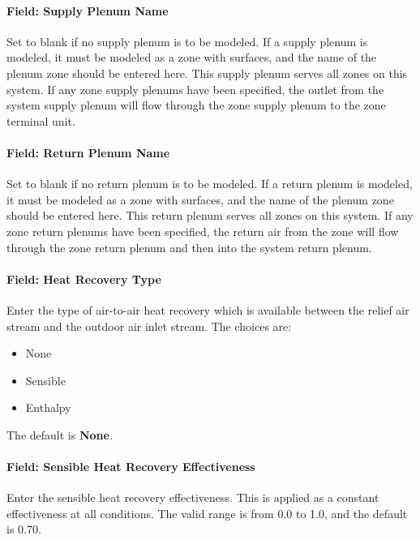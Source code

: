 \paragraph{Field: Supply Plenum Name}\label{field-supply-plenum-name-7}

Set to blank if no supply plenum is to be modeled. If a supply plenum is modeled, it must be modeled as a zone with surfaces, and the name of the plenum zone should be entered here. This supply plenum serves all zones on this system. If any zone supply plenums have been specified, the outlet from the system supply plenum will flow through the zone supply plenum to the zone terminal unit.

\paragraph{Field: Return Plenum Name}\label{field-return-plenum-name-8}

Set to blank if no return plenum is to be modeled. If a return plenum is modeled, it must be modeled as a zone with surfaces, and the name of the plenum zone should be entered here. This return plenum serves all zones on this system. If any zone return plenums have been specified, the return air from the zone will flow through the zone return plenum and then into the system return plenum.

\paragraph{Field: Heat Recovery Type}\label{field-heat-recovery-type-3}

Enter the type of air-to-air heat recovery which is available between the relief air stream and the outdoor air inlet stream. The choices are:

\begin{itemize}
\item
  None
\item
  Sensible
\item
  Enthalpy
\end{itemize}

The default is \textbf{None}\emph{.}

\paragraph{Field: Sensible Heat Recovery Effectiveness}\label{field-sensible-heat-recovery-effectiveness-3}

Enter the sensible heat recovery effectiveness. This is applied as a constant effectiveness at all conditions. The valid range is from 0.0 to 1.0, and the default is 0.70.


